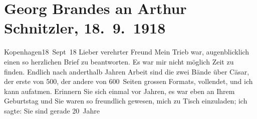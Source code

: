 

         
         \renewcommand{\erwaehntePersonen}{Personen: Gaius Iulius Caesar, Peter Nansen, Gerda Philipp, Georg Philipp, Olga Schnitzler, Lili Schnitzler, Heinrich Schnitzler}
         \renewcommand{\erwaehnteOrte}{Orte: Det Kongelige Teater, Dänemark, Kopenhagen, Skandinavien, Wien, Österreich}
         \renewcommand{\erwaehnteWerke}{Werke: Die Brüder Menthe, Gaius Julius Cæsar, Große Szene, Literatur, Stunde des Erkennens}
               \section[Georg Brandes an Arthur Schnitzler, 18. 9. 1918]{ Georg Brandes an Arthur Schnitzler, 18. 9. 1918}\nopagebreak{}\rehead{ }\begin{ledgroupsized}[t]{13cm}\normalsize\beginnumbering \toendnotes[C]{\smallbreak\pagebreak[2]} 
\toendnotes[C]{\smallbreak}\pstart
           \raggedleft{}{\pb}Kopenhagen18 Sept 18\pend
           \pstart{}Lieber verehrter Freund\pend\pstart
           Mein Trieb war, augenblicklich einen so herzlichen Brief zu beantworten. Es war mir
               nicht möglich Zeit zu finden. Endlich nach anderthalb Jahren Arbeit sind die zwei Bände über Cäsar, der erste von 500, der andere von 600 Seiten grossen Formats, vollendet, und
               ich kann aufatmen.\pend
           \pstart
           Erinnern Sie sich einmal vor Jahren, es war eben an Ihrem Geburtstag und Sie waren so
               freundlich gewesen, mich zu Tisch einzuladen; ich sagte: Sie sind gerade 20 Jahre

\end{ledgroupsized}
